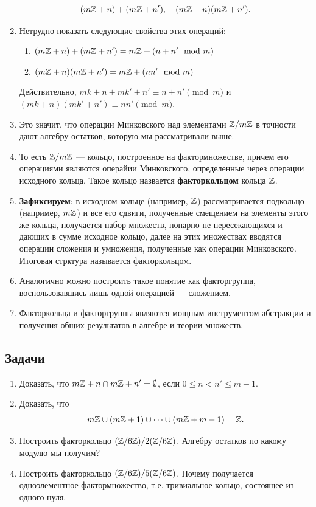 \begin{enumerate}
$$
(m\mathbb Z+n)+(m\mathbb Z+n'),\quad (m\mathbb Z+n)(m\mathbb Z+n').
$$
\item Нетрудно показать следующие свойства этих операций:
\begin{enumerate}[Z1]
\item $(m\mathbb Z+n)+(m\mathbb Z+n') = m\mathbb Z+(n+n'\mod m)$
\item $(m\mathbb Z+n)(m\mathbb Z+n') = m\mathbb Z+(nn'\mod m)$
\end{enumerate}
Действительно, $mk+n+mk'+n'\equiv n+n'\pmod m$ и $(mk+n)(mk'+n')\equiv nn'\pmod m$.
\item Это значит, что операции Минковского над элементами $\mathbb Z/m\mathbb Z$ в точности дают алгебру остатков, которую мы рассматривали выше.
\item То есть $\mathbb Z/m\mathbb Z$ --- кольцо, построенное на фактормножестве, причем его операциями являются операйии Минковского, определенные через операции исходного кольца. Такое кольцо назвается \textbf{факторкольцом} кольца $\mathbb Z$.
\item \textbf{Зафиксируем}: в исходном кольце (например, $\mathbb Z$) рассматривается подкольцо (например, $m\mathbb Z$) и все его сдвиги, полученные смещением на элементы этого же кольца, получается набор множеств, попарно не пересекающихся и дающих в сумме исходное кольцо, далее на этих множествах вводятся операции сложения и умножения, полученные как операции Минковского. Итоговая стрктура называется факторкольцом.
\item Аналогично можно построить такое понятие как факторгруппа, воспользовавшись лишь одной операцией --- сложением.
\item Факторкольца и факторгруппы являются мощным инструментом абстракции и получения общих результатов в алгебре и теории множеств.
\end{enumerate}


\subsection*{Задачи}
\begin{enumerate}
\item Доказать, что $m\mathbb Z+n\cap m\mathbb Z+n'=\emptyset$, если $0\le n<n'\le m-1$.
\item Доказать, что
$$
m\mathbb Z\cup (m\mathbb Z+1)\cup\dots\cup (m\mathbb Z+m-1) = \mathbb Z.
$$
\item Построить факторкольцо $(\mathbb Z/6\mathbb Z)/2(\mathbb Z/6\mathbb Z)$. Алгебру остатков по какому модулю мы получим?
\item Построить факторкольцо $(\mathbb Z/6\mathbb Z)/5(\mathbb Z/6\mathbb Z)$. Почему получается одноэлементное фактормножество, т.е. тривиальное кольцо, состоящее из одного нуля.
\end{enumerate}


